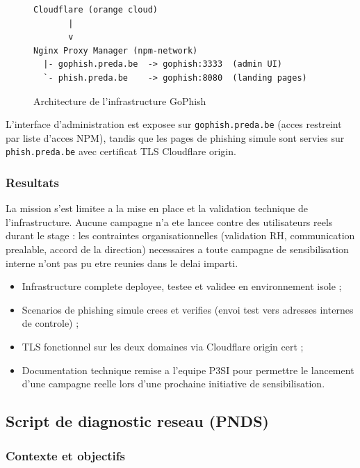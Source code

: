 \documentclass{rapport}
\begin{document}
\begin{figure}[H]
\centering
\begin{verbatim}
Cloudflare (orange cloud)
       |
       v
Nginx Proxy Manager (npm-network)
  |- gophish.preda.be  -> gophish:3333  (admin UI)
  `- phish.preda.be    -> gophish:8080  (landing pages)
\end{verbatim}
\caption{Architecture de l'infrastructure GoPhish}
\end{figure}

L'interface d'administration est exposee sur \texttt{gophish.preda.be}
(acces restreint par liste d'acces NPM), tandis que les pages de phishing
simule sont servies sur \texttt{phish.preda.be} avec certificat TLS
Cloudflare origin.

\subsubsection{Resultats}

La mission s'est limitee a la mise en place et la validation technique de
l'infrastructure. Aucune campagne n'a ete lancee contre des utilisateurs
reels durant le stage : les contraintes organisationnelles (validation RH,
communication prealable, accord de la direction) necessaires a toute
campagne de sensibilisation interne n'ont pas pu etre reunies dans le delai
imparti.

\begin{itemize}
  \item Infrastructure complete deployee, testee et validee en environnement
        isole ;
  \item Scenarios de phishing simule crees et verifies (envoi test vers
        adresses internes de controle) ;
  \item TLS fonctionnel sur les deux domaines via Cloudflare origin cert ;
  \item Documentation technique remise a l'equipe P3SI pour permettre le
        lancement d'une campagne reelle lors d'une prochaine initiative de
        sensibilisation.
\end{itemize}

\subsection{Script de diagnostic reseau (PNDS)}

\subsubsection{Contexte et objectifs}
\end{document}
